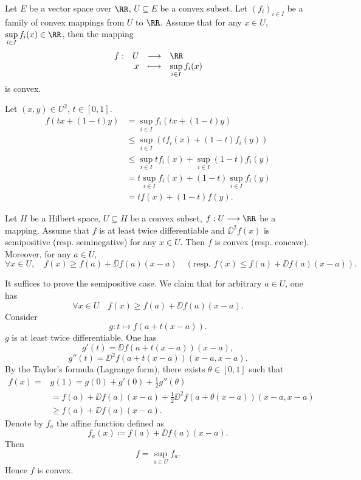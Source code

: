 \begin{propositionenv}
    Let $E$ be a vector space over $\RR$, $U \subseteq E$ be a convex subset.
    Let $(f_i)_{i \in I}$ be a family of convex mappings from $U$ to $\RR$.
    Assume that for any $x \in U$, $\displaystyle \sup_{i \in I}f_i(x) \in \RR$, then the mapping
    $$\begin{array}{rrcl}
        f : &  U & \longrightarrow & \RR\\
        & x & \longmapsto & \displaystyle \sup_{i \in I}f_i(x)
    \end{array}$$
    is convex.
\end{propositionenv}
\begin{proofenv}
    Let $(x,y) \in U^2$, $t \in [0,1]$.
    $$\begin{aligned}
        f(tx + (1 - t)y) &= \sup_{i \in I}f_i(tx + (1 - t)y)\\
        & \le \sup_{i \in I}(t f_i(x) + (1 - t)f_i(y))\\
        & \le \sup_{i \in I} t f_i(x) + \sup_{i \in I}(1 - t)f_i(y)\\
        & = t \sup_{i \in I}f_i(x) + (1 - t) \sup_{i \in I}f_i(y)\\
        & = t f(x) + (1 - t) f(y).
    \end{aligned}$$
\end{proofenv}

\begin{propositionenv}
    Let $H$ be a Hilbert space,
    $U \subseteq H$ be a convex subset,
    $f : U \longrightarrow \RR$ be a mapping.
    Assume that $f$ is at least twice differentiable and $\DD^2 f(x)$ is semipositive (resp. seminegative) for any $x \in U$.
    Then $f$ is convex (resp. concave).
    \quad Moreover, for any $a \in U$,
    $$\forall x \in U,\quad f(x) \ge f(a) + \DD f(a)(x - a) \quad \left(\text{resp. } f(x) \le f(a) + \DD f(a)(x - a) \right).$$
\end{propositionenv}
\begin{proofenv}
    It suffices to prove the semipositive case.
    We claim that for arbitrary $a \in U$, one has
    $$\forall x \in U \quad f(x) \ge f(a) + \DD f(a)(x - a).$$
    Consider
    $$g : t \longmapsto f(a + t(x - a)).$$
    $g$ is at least twice differentiable.
    One has
    $$g'(t) = \DD f(a + t(x - a))(x - a),$$
    $$g''(t) = \DD^2 f(a + t(x - a))(x - a, x - a).$$
    By the Taylor's formula (Lagrange form), there exists $\theta \in [0,1]$ such that
    $$\begin{aligned}
        f(x) = & g(1) = g(0) + g'(0) + \frac{1}{2} g''(\theta)\\
        & = f(a) + \DD f(a)(x - a) + \frac{1}{2} \DD^2 f(a + \theta(x - a))(x - a, x - a)\\
        & \ge f(a) + \DD f(a)(x - a). 
    \end{aligned}$$
    Denote by $f_a$ the affine function defined as
    $$f_a(x) \coloneq f(a) + \DD f(a) (x - a).$$
    Then
    $$f = \sup_{a \in U} f_{a}.$$
    Hence $f$ is convex.
\end{proofenv}

